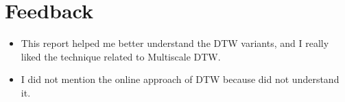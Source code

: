\documentclass[a4paper, 9pt, twocolumn]{extarticle}
\begin{document}
\section{Feedback}
\begin{itemize}
  \item This report helped me better understand the DTW variants, and I really liked the technique related to Multiscale DTW.
  \item I did not mention the online approach of DTW because did not understand it.
\end{itemize}
\end{document}
